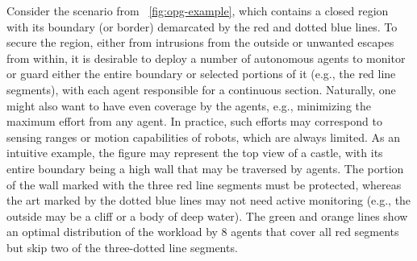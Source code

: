 

\def\R{\mathcal R}
\def\C{\mathcal C}
\def\S{\mathcal S}
\def\P{\mathcal P}
\def\G{\mathcal G}
\def\W{\mathcal W}
\def\opg{{\sc {OPG}}\xspace}

Consider the scenario from ~\ref{fig:opg-example}, which contains a closed region with its boundary (or border) demarcated by the red and dotted blue lines. To secure the region, either from intrusions from the outside or unwanted escapes from within, it is desirable to deploy a number of autonomous agents to monitor or guard either the entire boundary or selected portions of it (e.g., the red line segments), with each agent responsible for a continuous section. 
%
Naturally, one might also want to have even coverage by the agents, e.g., minimizing the maximum effort from any agent. In practice, such efforts may correspond to sensing ranges or motion capabilities of robots, which are always limited. 
%
As an intuitive example, the figure may represent the top view of a castle, with its entire boundary being a high wall that may be traversed by agents. 
%
The portion of the wall marked with the three red line segments must be protected, whereas the art marked by the dotted blue lines may not need active monitoring (e.g., the outside may be a cliff or a body of deep water). The green and orange lines show an optimal distribution of the workload by $8$ agents that cover all red segments but skip two of the three-dotted line segments. 

